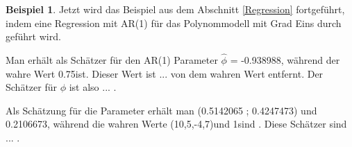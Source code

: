 \documentclass[12pt,a4paper]{article}
\theoremstyle{definition}
\newtheorem{Beispiel}[Definition]{Beispiel}
\theoremstyle{definition}
\theoremstyle{definition}
\theoremstyle{definition}
\newcommand{\nobs}{50}
\newcommand{\betatrue}{(10,5,-4,7)}
\newcommand{\phitrue}{0.75}
\newcommand{\sigmatrue}{1}
\newcommand{\betaARone}{ (0.5142065 ; 0.4247473) }
\newcommand{\sigmaARone}{0.2106673}
\newcommand{\phiestone}{-0.938988}
\newcommand{\Xidat}{...}
\begin{document}
\begin{Beispiel}
Jetzt wird das Beispiel aus dem Abschnitt \ref{Regression} fortgeführt, indem eine Regression mit AR(1) für das Polynommodell mit Grad Eins durch geführt wird. 

Man erhält als Schätzer für den AR(1) Parameter $\hat{\phi}$ = \phiestone , während der wahre Wert \phitrue ist. Dieser Wert ist ... von dem wahren Wert entfernt. Der Schätzer für $\phi$ ist also ... .

Als Schätzung für die Parameter erhält man \betaARone und \sigmaARone , während die wahren Werte \betatrue und \sigmatrue sind . Diese Schätzer sind ... .

%
%
%
%
%
%
%


\end{Beispiel}
\end{document}
